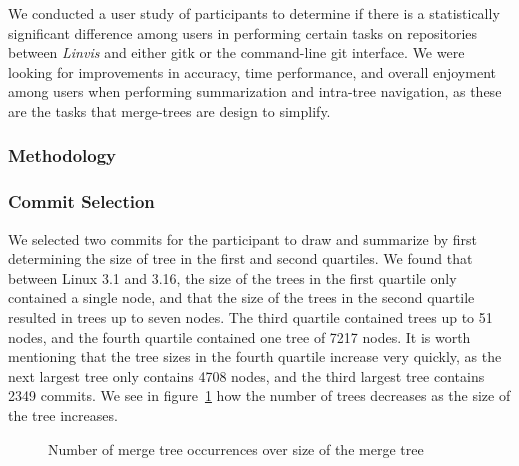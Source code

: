 We conducted a user study of  participants to determine if there is a
statistically significant difference among users in performing certain tasks on
repositories between \textit{Linvis} and either gitk or the command-line git
interface. We were looking for improvements in accuracy, time performance, and
overall enjoyment among users when performing summarization and intra-tree
navigation, as these are the tasks that merge-trees are design to simplify.



\subsubsection{Methodology}
\label{ssub:methodology}

\subsubsection{Commit Selection}
\label{ssub:commit_selection}

We selected two commits for the participant to draw and summarize by first
determining the size of tree in the first and second quartiles. We found that
between Linux 3.1 and 3.16, the size of the trees in the first quartile only
contained a single node, and that the size of the trees in the second quartile
resulted in trees up to seven nodes. The third quartile contained trees up to 51
nodes, and the fourth quartile contained one tree of 7217 nodes. It is worth
mentioning that the tree sizes in the fourth quartile increase very quickly, as the
next largest tree only contains 4708 nodes, and the third largest tree contains 2349
commits. We see in figure~\ref{fig:tree_size} how the number of trees decreases as
the size of the tree increases.

\begin{figure}[htpb]
\begin{center}
\caption{Number of merge tree occurrences over size of the merge tree}
\label{fig:tree_size}
\end{center}
\end{figure}

